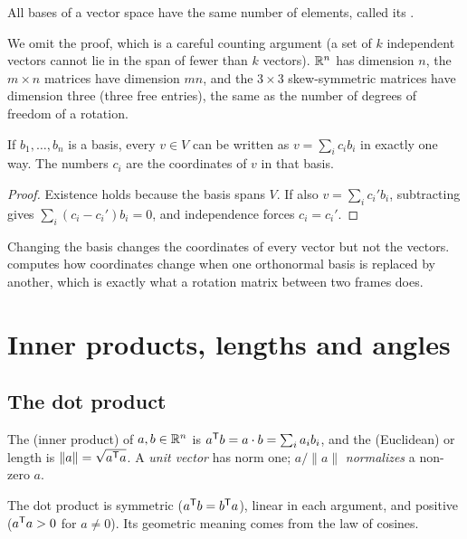 \begin{theorem}[Dimension]
All bases of a vector space have the same number of elements, called its .
\end{theorem}

We omit the proof, which is a careful counting argument (a set of $k$ independent vectors cannot lie in the span
of fewer than $k$ vectors). $\mathbb{R}^n$ has dimension $n$, the $m\times n$ matrices have dimension $mn$, and the $3\times3$
skew-symmetric matrices have dimension three (three free entries), the same as the number of degrees of freedom
of a rotation.

\begin{proposition}
If $b_1, \dots, b_n$ is a basis, every $v \in V$ can be written as $v = \sum_i c_ib_i$ in exactly one way. The
numbers $c_i$ are the coordinates of $v$ in that basis.
\end{proposition}
\begin{proof}
Existence holds because the basis spans $V$. If also $v = \sum_i c_i'b_i$, subtracting gives
$\sum_i(c_i - c_i')b_i = 0$, and independence forces $c_i = c_i'$.
\end{proof}

Changing the basis changes the coordinates of every vector but not the vectors. 
computes how coordinates change when one orthonormal basis is replaced by another, which is exactly what a
rotation matrix between two frames does.

\section{Inner products, lengths and angles}

\subsection{The dot product}

\begin{definition}
The  (inner product) of $a, b \in \mathbb{R}^n$ is $a^{\mathsf{T}} b = a\cdot b = \sum_i a_ib_i$, and the
(Euclidean)  or length is $\|a\| = \sqrt{a^{\mathsf{T}} a}$. A \emph{unit vector} has norm one; $a/\|a\|$
\emph{normalizes} a non-zero $a$.
\end{definition}

The dot product is symmetric ($a^{\mathsf{T}} b = b^{\mathsf{T}} a$), linear in each argument, and positive ($a^{\mathsf{T}} a > 0$ for $a\ne0$).
Its geometric meaning comes from the law of cosines.


